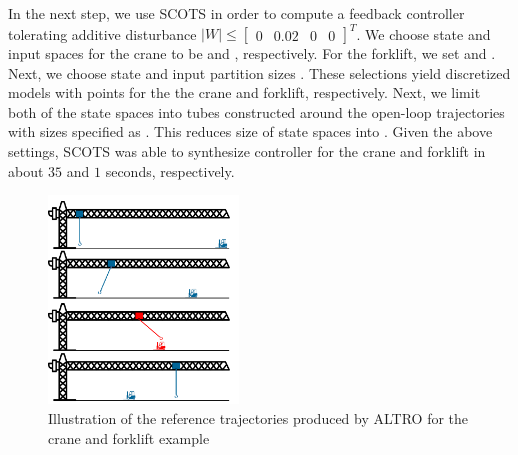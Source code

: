 In the next step, we use SCOTS in order to compute a feedback controller tolerating additive disturbance $|W|\leq\begin{bmatrix}0&0.02&0&0\end{bmatrix}^T$. %
We choose state and input spaces for the crane to be  and , respectively. For the forklift, we set  and . %
Next, we choose state and input partition sizes . These selections yield discretized models with  points for the the crane and forklift, respectively. Next, we limit both of the state spaces into tubes constructed around the open-loop trajectories with sizes specified as . This reduces size of state spaces into . Given the above settings, SCOTS was able to synthesize controller for the crane and forklift in about $35$ and $1$ seconds, respectively.
			
\begin{figure}[t]
	\centering
	\includegraphics[width=0.45\textwidth]{figures/crane_and_lifter.png}
	\caption{Illustration of the reference trajectories produced by ALTRO for the crane and forklift example}
\end{figure}\label{fig:cr_and_lft}


